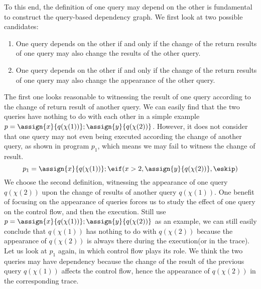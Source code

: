 To this end, the definition of one query may depend on the other is fundamental to construct the query-based dependency graph. We first look at two possible candidates:
\begin{enumerate}
    \item One query depends on the other if and only if the change of the return results of one query may also change the results of the other query.
    \item One query depends on the other if and only if the change of the return results of one query may also change the appearance of the other query.
\end{enumerate}
   The first one looks reasonable to witnessing the result of one query according to the change of return result of another query. We can easily find that the two queries have nothing to do with each other in a simple example   
     $ p = \assign{x}{q(\chi(1))} ; \assign{y}{q(\chi(2))}$.  However,  it does not consider that one query may not even being executed according the change of another query, as shown in program $p_1$, which means we may fail to witness the change of result.
      \[
      p_1 = \assign{x}{q(\chi(1))} ; \eif( x > 2 ,\assign{y}{q(\chi(2))}, \eskip )
   \]
   We choose the second definition, witnessing the appearance of one query $q(\chi(2))$ upon the change of results of another query $q(\chi(1))$. One benefit of focusing on the appearance of queries forces us to study the effect of one query on the control flow, and then the execution. Still use  $p= \assign{x}{q(\chi(1))} ; \assign{y}{q(\chi(2))}$ as an example, we can still easily conclude that $q(\chi(1))$ has nothing to do with $q(\chi(2))$ because the appearance of $q(\chi(2))$ is always there during the execution(or in the trace). Let us look at $p_1$ again, in which control flow plays its role. We think the two queries may have dependency because the change of the result of the previous query $q(\chi(1))$ affects the control flow, hence the appearance of $q(\chi(2))$ in the corresponding trace.
   
